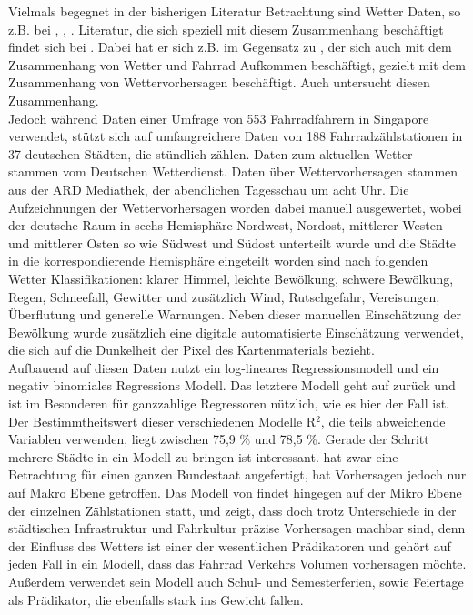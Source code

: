 \documentclass[a4paper,12pt]{thesis}
\begin{document}
Vielmals begegnet in der bisherigen Literatur Betrachtung sind Wetter Daten, so z.B. bei \cite{Holmgren2017}, \cite{Broucke2019}, \cite{Li2015}. Literatur, die sich speziell mit diesem Zusammenhang beschäftigt findet sich bei \cite{Wessel2020}. Dabei hat er sich z.B. im Gegensatz zu \cite{Nankervis1999}, der sich auch mit dem Zusammenhang von Wetter und Fahrrad Aufkommen beschäftigt, gezielt mit dem Zusammenhang von Wettervorhersagen beschäftigt. Auch \cite{Meng2016} untersucht diesen Zusammenhang.\\
Jedoch während \cite{Meng2016} Daten einer Umfrage von 553 Fahrradfahrern in Singapore verwendet, stützt sich \cite{Wessel2020} auf umfangreichere Daten von 188 Fahrradzählstationen in 37 deutschen Städten, die stündlich zählen. Daten zum aktuellen Wetter stammen vom Deutschen Wetterdienst. Daten über Wettervorhersagen stammen aus der ARD Mediathek, der abendlichen Tagesschau um acht Uhr. Die Aufzeichnungen der Wettervorhersagen worden dabei manuell ausgewertet, wobei der deutsche Raum in sechs Hemisphäre Nordwest, Nordost, mittlerer Westen und mittlerer Osten so wie Südwest und Südost unterteilt wurde und die Städte in die korrespondierende Hemisphäre eingeteilt worden sind nach folgenden Wetter Klassifikationen: klarer Himmel, leichte Bewölkung, schwere Bewölkung, Regen, Schneefall, Gewitter und zusätzlich Wind, Rutschgefahr, Vereisungen, Überflutung und generelle Warnungen. Neben dieser manuellen Einschätzung der Bewölkung wurde zusätzlich eine digitale automatisierte Einschätzung verwendet, die sich auf die Dunkelheit der Pixel des Kartenmaterials bezieht.\\
Aufbauend auf diesen Daten nutzt \cite{Wessel2020} ein log-lineares Regressionsmodell und ein negativ binomiales Regressions Modell. Das letztere Modell geht auf \cite{Hausman1984} zurück und ist im Besonderen für ganzzahlige Regressoren nützlich, wie es hier der Fall ist. Der Bestimmtheitswert dieser verschiedenen Modelle R$^2$, die teils abweichende Variablen verwenden, liegt zwischen 75,9 \% und 78,5 \%. Gerade der Schritt mehrere Städte in ein Modell zu bringen ist interessant. \cite{Saha2018} hat zwar eine Betrachtung für einen ganzen Bundestaat angefertigt, hat Vorhersagen jedoch nur auf Makro Ebene getroffen. Das Modell von \cite{Wessel2020} findet hingegen auf der Mikro Ebene der einzelnen Zählstationen statt, und zeigt, dass doch trotz Unterschiede in der städtischen Infrastruktur und Fahrkultur präzise Vorhersagen machbar sind, denn der Einfluss des Wetters ist einer der wesentlichen Prädikatoren und gehört auf jeden Fall in ein Modell, dass das Fahrrad Verkehrs Volumen vorhersagen möchte. Außerdem verwendet sein Modell auch Schul- und Semesterferien, sowie Feiertage als Prädikator, die ebenfalls stark ins Gewicht fallen.\\
\end{document}
